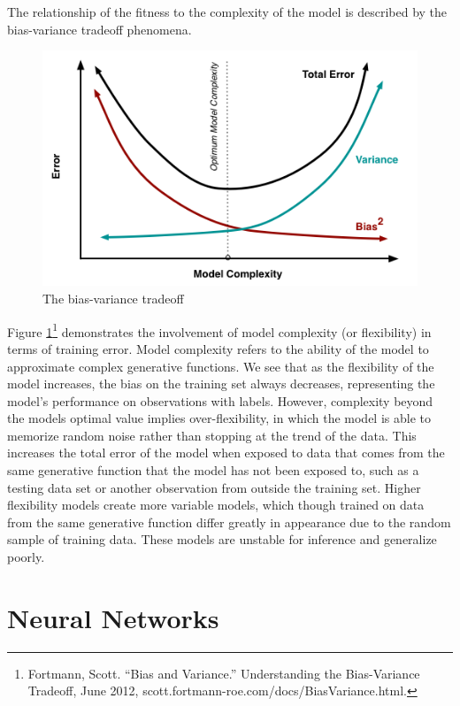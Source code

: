 \documentclass[12pt,twoside]{reedthesis}
\begin{document}
The relationship of the fitness to the complexity of the model is
described by the bias-variance tradeoff phenomena.
\begin{figure}
\centering
\includegraphics{figure/biasvariance.png}
\caption{\label{fig:biasvar}The bias-variance tradeoff}
\end{figure}
Figure \ref{fig:biasvar}\footnote{Fortmann, Scott. ``Bias and
  Variance.'' Understanding the Bias-Variance Tradeoff, June 2012,
  scott.fortmann-roe.com/docs/BiasVariance.html.} demonstrates the
involvement of model complexity (or flexibility) in terms of training
error. Model complexity refers to the ability of the model to
approximate complex generative functions. We see that as the flexibility
of the model increases, the bias on the training set always decreases,
representing the model's performance on observations with labels.
However, complexity beyond the models optimal value implies
over-flexibility, in which the model is able to memorize random noise
rather than stopping at the trend of the data. This increases the total
error of the model when exposed to data that comes from the same
generative function that the model has not been exposed to, such as a
testing data set or another observation from outside the training set.
Higher flexibility models create more variable models, which though
trained on data from the same generative function differ greatly in
appearance due to the random sample of training data. These models are
unstable for inference and generalize poorly.

\section{Neural Networks}\label{neural-networks}
\end{document}
